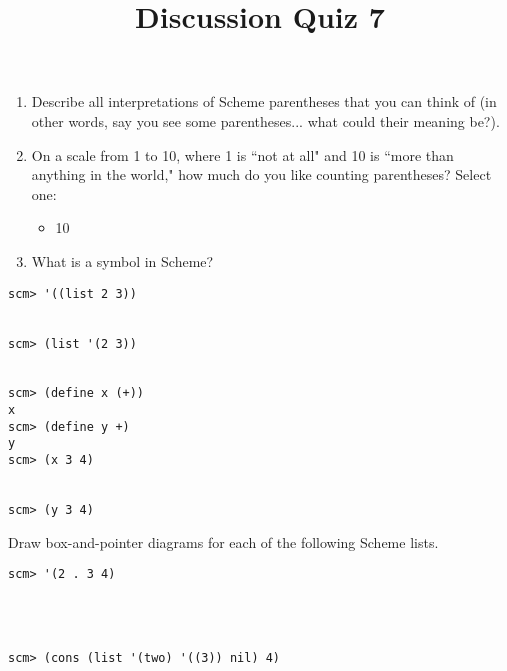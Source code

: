 \documentclass[twoside]{article}
\title{\sc Discussion Quiz 7}
\begin{document}
\thispagestyle{empty}
\maketitle

\begin{enumerate}

\begin{enumerate}
\item Describe all interpretations of Scheme parentheses that you can think of (in other words, say you see some parentheses... what could their meaning be?).

\vspace{0.5in}

\item On a scale from 1 to 10, where 1 is ``not at all" and 10 is ``more than anything in the world," how much do you like counting parentheses? Select one:

\begin{itemize}
\item 10
\end{itemize}

\vspace{0.02in}

\item What is a symbol in Scheme?

\vspace{0.5in}

\end{enumerate}


\begin{lstlisting}
scm> '((list 2 3))


scm> (list '(2 3))


scm> (define x (+))
x
scm> (define y +)
y
scm> (x 3 4)


scm> (y 3 4)
\end{lstlisting}

\vspace{0.3in}


Draw box-and-pointer diagrams for each of the following Scheme lists.

\begin{lstlisting}
scm> '(2 . 3 4)




scm> (cons (list '(two) '((3)) nil) 4)
\end{lstlisting}


\end{enumerate}
\end{document}
